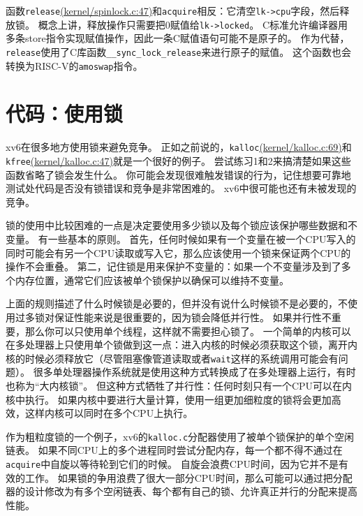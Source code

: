 函数\texttt{release}\href{https://github.com/mit-pdos/xv6-riscv/blob/risc/kernel/spinlock.c#L47}{(kernel/spinlock.c:47)}和\texttt{acquire}相反：它清空\texttt{lk->cpu}字段，然后释放锁。
概念上讲，释放操作只需要把0赋值给\texttt{lk->locked}。
C标准允许编译器用多条store指令实现赋值操作，因此一条C赋值语句可能不是原子的。
作为代替，\texttt{release}使用了C库函数\texttt{\_\_sync\_lock\_release}来进行原子的赋值。
这个函数也会转换为RISC-V的\texttt{amoswap}指令。

\section{代码：使用锁}
xv6在很多地方使用锁来避免竞争。
正如之前说的，\texttt{kalloc}\href{https://github.com/mit-pdos/xv6-riscv/blob/risc/kernel/kalloc.c#L69}{(kernel/kalloc.c:69)}和\texttt{kfree}\href{https://github.com/mit-pdos/xv6-riscv/blob/risc/kernel/kalloc.c#L47}{(kernel/kalloc.c:47)}就是一个很好的例子。
尝试练习1和2来搞清楚如果这些函数省略了锁会发生什么。
你可能会发现很难触发错误的行为，记住想要可靠地测试处代码是否没有锁错误和竞争是非常困难的。
xv6中很可能也还有未被发现的竞争。

锁的使用中比较困难的一点是决定要使用多少锁以及每个锁应该保护哪些数据和不变量。
有一些基本的原则。
首先，任何时候如果有一个变量在被一个CPU写入的同时可能会有另一个CPU读取或写入它，那么应该使用一个锁来保证两个CPU的操作不会重叠。
第二，记住锁是用来保护不变量的：如果一个不变量涉及到了多个内存位置，通常它们应该被单个锁保护以确保可以维持不变量。

上面的规则描述了什么时候锁是必要的，但并没有说什么时候锁不是必要的，不使用过多锁对保证性能来说是很重要的，因为锁会降低并行性。
如果并行性不重要，那么你可以只使用单个线程，这样就不需要担心锁了。
一个简单的内核可以在多处理器上只使用单个锁做到这一点：进入内核的时候必须获取这个锁，离开内核的时候必须释放它（尽管阻塞像管道读取或者\texttt{wait}这样的系统调用可能会有问题）。
很多单处理器操作系统就是使用这种方式转换成了在多处理器上运行，有时也称为“大内核锁”。
但这种方式牺牲了并行性：任何时刻只有一个CPU可以在内核中执行。
如果内核中要进行大量计算，使用一组更加细粒度的锁将会更加高效，这样内核可以同时在多个CPU上执行。

作为粗粒度锁的一个例子，xv6的\texttt{kalloc.c}分配器使用了被单个锁保护的单个空闲链表。
如果不同CPU上的多个进程同时尝试分配内存，每一个都不得不通过在\texttt{acquire}中自旋以等待轮到它们的时候。
自旋会浪费CPU时间，因为它并不是有效的工作。
如果锁的争用浪费了很大一部分CPU时间，那么可能可以通过把分配器的设计修改为有多个空闲链表、每个都有自己的锁、允许真正并行的分配来提高性能。

